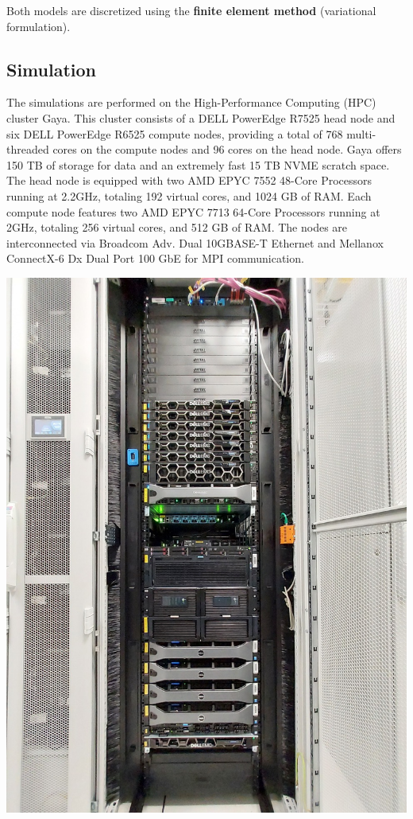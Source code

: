 \documentclass[12pt]{article}
\begin{document}
Both models are discretized using the \textbf{finite element method} (variational
formulation).

\subsection{Simulation}
\begin{minipage}[t]{0.49\textwidth}
  \justifying
  The simulations are performed on the High-Performance Computing (HPC) cluster Gaya.
  This cluster consists of a DELL PowerEdge R7525 head node and six DELL PowerEdge
  R6525 compute nodes, providing a total of 768 multi-threaded cores on the compute
  nodes and 96 cores on the head node. Gaya offers 150 TB of storage for data and
  an extremely fast 15 TB NVME scratch space. The head node is equipped with two AMD EPYC 7552 48-Core Processors running at
  2.2GHz, totaling 192 virtual cores, and 1024 GB of RAM.
  Each compute node features two AMD EPYC 7713 64-Core Processors running at 2GHz,
  totaling 256 virtual cores, and 512 GB of RAM. The nodes are interconnected via
  Broadcom Adv. Dual 10GBASE-T Ethernet and Mellanox ConnectX-6 Dx Dual Port 100
  GbE for MPI communication.
\end{minipage}
\hfill
\begin{minipage}[t]{0.49\textwidth}
  \centering
  \includegraphics[width=1.1\textwidth, angle=-90]{images/gaya.jpeg}
\end{minipage}
\end{document}
